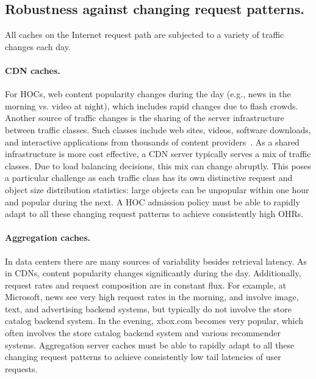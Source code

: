 \documentclass{article}
\begin{document}
\subsection{Robustness against changing request patterns.}
All caches on the Internet request path are subjected to a variety of traffic changes each day.

\paragraph{CDN caches.}
For HOCs, web content popularity changes during the day (e.g., news in the morning vs. video at night), which includes rapid changes due to flash crowds.
Another source of traffic changes is the sharing of the server infrastructure between traffic classes.
Such classes include  web sites, videos, software downloads, and interactive applications from thousands of content providers~\cite{NygrenSS10}.
As a shared infrastructure is more cost effective, a CDN server typically serves a mix of traffic classes.
Due to load balancing decisions, this mix can change abruptly.
This poses a particular challenge as each traffic class has its own distinctive request and object size distribution statistics: large objects can be unpopular within one hour and popular during the next.
A HOC admission policy must be able to rapidly adapt to all these changing request patterns to achieve consistently high OHRs.

\paragraph{Aggregation caches.}
In data centers there are many sources of variability besides retrieval latency.
As in CDNs, content popularity changes significantly during the day.
Additionally, request rates and request composition are in constant flux.
For example, at Microsoft, news see very high request rates in the morning, and involve image, text, and advertising backend systems, but typically do not involve the store catalog backend system.
In the evening, xbox.com becomes very popular, which often involves the store catalog backend system and various recommender systems.
Aggregation server caches must be able to rapidly adapt to all these changing request patterns to achieve consistently low tail latencies of user requests.
\end{document}
